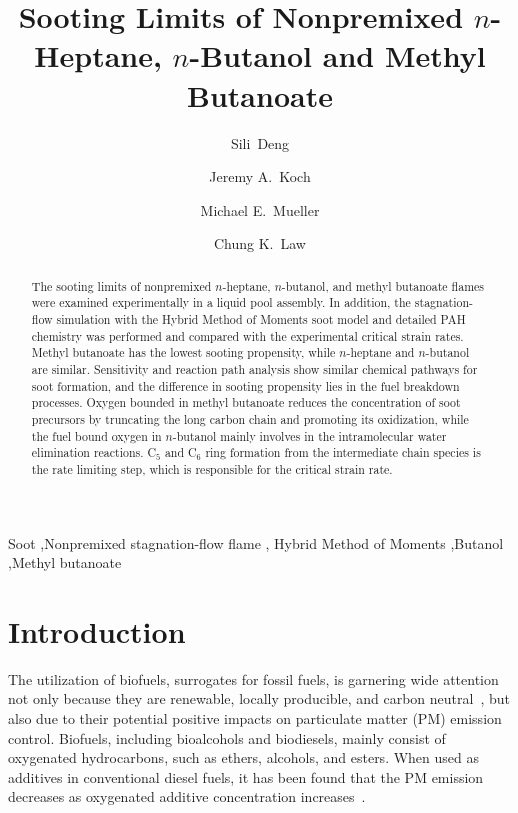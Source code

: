 \documentclass[review,3p,times]{elsarticleUS}
\begin{document}
\begin{frontmatter}

\title{Sooting Limits of Nonpremixed $n$-Heptane, $n$-Butanol and Methyl Butanoate}

\author{Sili~Deng}
\author{Jeremy A.~Koch}
\author{Michael E.~Mueller}
\author{Chung K.~Law}

\address{Department of Mechanical and Aerospace Engineering, Princeton University, Princeton, NJ 08544, USA}


\begin{abstract}
  The sooting limits of nonpremixed $n$-heptane, $n$-butanol, and methyl butanoate flames were examined experimentally in a liquid pool assembly. In addition, the stagnation-flow simulation with the Hybrid Method of Moments soot model and detailed PAH chemistry was performed and compared with the experimental critical strain rates. Methyl butanoate has the lowest sooting propensity, while $n$-heptane and $n$-butanol are similar. Sensitivity and reaction path analysis show similar chemical pathways for soot formation, and the difference in sooting propensity lies in the fuel breakdown processes. Oxygen bounded in methyl butanoate reduces the concentration of soot precursors by truncating the long carbon chain and promoting its oxidization, while the fuel bound oxygen in $n$-butanol mainly involves in the intramolecular water elimination reactions. C$_5$ and C$_6$ ring formation from the intermediate chain species is the rate limiting step, which is responsible for the critical strain rate.
\end{abstract}

\begin{keyword} 
Soot \sep Nonpremixed stagnation-flow flame \sep
Hybrid Method of Moments \sep Butanol \sep Methyl butanoate
\end{keyword}

\end{frontmatter}


\section{Introduction}

The utilization of biofuels, surrogates for fossil fuels, is garnering wide attention not only because they are renewable, locally producible, and carbon neutral~\cite{liu11}, but also due to their potential positive impacts on particulate matter (PM) emission control. Biofuels, including bioalcohols and biodiesels, mainly consist of oxygenated hydrocarbons, such as ethers, alcohols, and esters. When used as additives in conventional diesel fuels, it has been found that the PM emission decreases as oxygenated additive concentration increases~\cite{graboski98}. 
\end{document}
